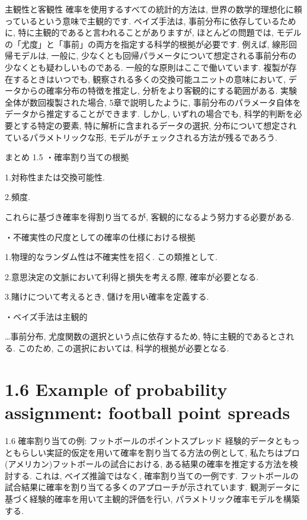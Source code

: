 \documentclass[10pt,dvipdfmx,a4]{beamer}
\begin{document}

\begin{frame}{主観性と客観性}
確率を使用するすべての統計的方法は, 世界の数学的理想化に頼っているという意味で主観的です.
ベイズ手法は, 事前分布に依存しているために, 特に主観的であると言われることがありますが, ほとんどの問題では, モデルの「尤度」と「事前」の両方を指定する科学的根拠が必要です.
例えば, 線形回帰モデルは, 一般に, 少なくとも回帰パラメータについて想定される事前分布の少なくとも疑わしいものである.
一般的な原則はここで働いています.
複製が存在するときはいつでも, 観察される多くの交換可能ユニットの意味において, データからの確率分布の特徴を推定し, 分析をより客観的にする範囲がある.
実験全体が数回複製された場合, 5章で説明したように, 事前分布のパラメータ自体をデータから推定することができます.
しかし, いずれの場合でも, 科学的判断を必要とする特定の要素, 特に解析に含まれるデータの選択, 分布について想定されているパラメトリックな形, モデルがチェックされる方法が残るであろう.
\end{frame}


\begin{frame}{まとめ 1.5}
・確率割り当ての根拠

1.対称性または交換可能性.

2.頻度.

これらに基づき確率を得割り当てるが, 客観的になるよう努力する必要がある.


・不確実性の尺度としての確率の仕様における根拠

1.物理的なランダム性は不確実性を招く.
この類推として.

2.意思決定の文脈において利得と損失を考える際, 確率が必要となる.

3.賭けについて考えるとき, 儲けを用い確率を定義する.

・ベイズ手法は主観的

…事前分布, 尤度関数の選択という点に依存するため, 特に主観的であるとされる.
このため, この選択においては, 科学的根拠が必要となる.
\end{frame}

\section{1.6 Example of probability assignment: football point spreads}
\begin{frame}{1.6 確率割り当ての例: フットボールのポイントスプレッド}
経験的データともっともらしい実証的仮定を用いて確率を割り当てる方法の例として, 私たちはプロ(アメリカン)フットボールの試合における, ある結果の確率を推定する方法を検討する.
これは, ベイズ推論ではなく, 確率割り当ての一例です.
フットボールの試合結果に確率を割り当てる多くのアプローチが示されています.
観測データに基づく経験的確率を用いて主観的評価を行い, パラメトリック確率モデルを構築する.
\end{frame}
\end{document}
